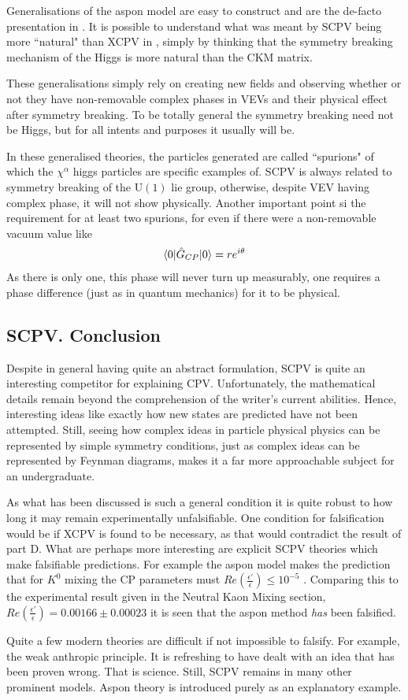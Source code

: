 Generalisations of the aspon model are easy to construct and are the de-facto presentation in \cite{SCPV5}. It is possible to understand what was meant by SCPV being more ``natural" than XCPV in \cite{SCPV1}, simply by thinking that the symmetry breaking mechanism of the Higgs is more natural than the CKM matrix. 


These generalisations simply rely on creating new fields and observing whether or not they have non-removable complex phases in VEVs and their physical effect after symmetry breaking. To be totally general the symmetry breaking need not be Higgs, but for all intents and purposes it usually will be.

In these generalised theories, the particles generated are called ``spurions" of which the $\chi^\alpha$ higgs particles are specific examples of. SCPV is always related to symmetry breaking of the $\mathrm{U}(1)$ lie group, otherwise, despite VEV having complex phase, it will not show physically. Another important point si the requirement for at least two spurions, for even if there were a non-removable vacuum value like
\begin{align*}
\braket{0|\hat{G}_{CP}|0} = r e^{i\theta}
\end{align*}
As there is only one, this phase will never turn up measurably, one requires a phase difference (just as in quantum mechanics) for it to be physical.

\subsection{SCPV. Conclusion}
Despite in general having quite an abstract formulation, SCPV is quite an interesting competitor for explaining CPV. Unfortunately, the mathematical details remain beyond the comprehension of the writer's current abilities. Hence, interesting ideas like exactly how new states are predicted have not been attempted. Still, seeing how complex ideas in particle physical physics can be represented by simple symmetry conditions, just as complex ideas can be represented by Feynman diagrams, makes it a far more approachable subject for an undergraduate.

As what has been discussed is such a general condition it is quite robust to how long it may remain experimentally unfalsifiable. One condition for falsification would be if XCPV is found to be necessary, as that would contradict the result of part D. What are perhaps more interesting are explicit SCPV theories which make falsifiable predictions. For example the aspon model makes the prediction that for $K^0$ mixing the CP parameters must $Re(\frac{\epsilon'}{\epsilon}) \leq 10^{-5}$ \cite{SCPV7}. Comparing this to the experimental result given in the Neutral Kaon Mixing section, $Re(\frac{\epsilon'}{\epsilon})=0.00166 \pm 0.00023$ it is seen that the aspon method \textit{has} been falsified. 

Quite a few modern theories are difficult if not impossible to falsify. For example, the weak anthropic principle. It is refreshing to have dealt with an idea that has been proven wrong. That is science. Still, SCPV remains in many other prominent models. Aspon theory is introduced purely as an explanatory example.

